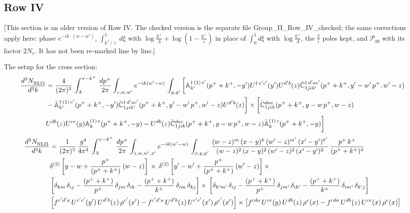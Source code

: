 \documentclass[9pt]{article}
\def\mf#1{\mathbb{#1}}
\numberwithin{equation}{section}
\begin{document}
\subsection{Row IV\,}
{\color{red}[This section is an older version of Row IV. The checked version is the separate file Group\_II\_Row\_IV\_checked; the same corrections apply here: phase $e^{-ik\cdot(w-w')}$, $\int_{k^+/\vee}^{1}d\xi$ with $\log\frac{k^+}{\Lambda}+\log(1-\frac{k^+}{\vee})$ in place of $\int_0^1 d\xi$ with $\log\frac{k^+}{\Lambda}$, the $\frac{2}{\epsilon}$ poles kept, and $\mathcal{P}_{gg}$ with its factor $2N_c$. It has not been re-marked line by line.]}\par\noindent The setup for the cross section: 
\begin{align}
    \frac{d^{3}N_{\rm NLO}^{\rm}}{d^{3}k}  & = \frac{4}{(2\pi)^{3}}\,\int_{\Lambda}^{\vee-k^{+}}\, \frac{dp^{+}}{2\pi}\int_{z,w,w^{\prime}} e^{-ik(w^{\prime}-w)}\,  \int_{y,y^{\prime}}\bigg[\mf{A}^{\dagger\, (1)\,e^{\prime}}_{k^{\prime}}(p^{+}+k^{+},-y^{\prime})U^{\dagger\, e^{\prime}c^{\prime}}(y^{\prime})U^{d^{\prime}b}(z) \Bar{\mf{C}}^{\dagger\, d^{\prime}ac^{\prime}}_{1jik^{\prime}}(p^{+}+k^{+},y^{\prime}-w^{\prime}\, p^{+},w^{\prime}-z) \notag \\ &  -\Bar{\mf{A}}^{\dagger\, (1)\,c^{\prime}}_{k^{\prime}}(p^{+}+k^{+},-y^{\prime}) \Bar{\mf{C}}^{\dagger\, d^{\prime}ac^{\prime}}_{1jik^{\prime}}(p^{+}+k^{+},y^{\prime}-w^{\prime}\, p^{+},w^{\prime}-z)U^{d^{\prime}b}(z)\bigg]\times\bigg[\Bar{\mf{C}}^{dac}_{1jik}(p^{+}+k^{+},y-w\, p^{+},w-z)\notag \\ & U^{db}(z)U^{ce}(y) \mf{A}^{(1)\,e}_{k}(p^{+}+k^{+},-y) -U^{db}(z) \Bar{\mf{C}}^{dac}_{1jik}(p^{+}+k^{+},y-w\, p^{+},w-z)\Bar{\mf{A}}^{(1)\,c}_{k}(p^{+}+k^{+},-y)\bigg]\nonumber
\end{align}
\begin{align}
     \frac{d^{3}N_{\rm NLO}^{\rm}}{d^{3}k}  & = \frac{1}{(2\pi)^{3}}\,\frac{g^{4}}{4\pi^{4}}\,\int_{\Lambda}^{\vee-k^{+}}\, \frac{dp^{+}}{2\pi}\int_{z,w,w^{\prime},x'} e^{-ik(w^{\prime}-w)}\,  \int_{x,y,y^{\prime}}\,\frac{(w-z)^{m}\,(x-y)^{k}\,(w'-z)^{m'}\,(x'-y')^{k'}}{(w-z)^{2}\,(x-y)^{2}\,(w'-z)^{2}\,(x'-y')^{2}}\,\frac{p^{+}\,k^{+}}{(p^{+}+k^{+})^{4}}\notag \\ & \delta^{(2)}\left[y-w+\frac{p^{+}}{(p^{+}+k^{+})}\,(w-z)\right]\,\times\, \delta^{(2)}\left[y'-w'+\frac{p^{+}}{(p^{+}+k^{+})}\,(w'-z)\right]\times\notag \\ &  \left[\delta_{km}\,\delta_{ij}-\frac{(p^{+}+k^{+})}{p^{+}}\,\delta_{jm}\,\delta_{ik}-\frac{(p^{+}+k^{+})}{k^{+}}\,\delta_{im}\,\delta_{kj}\right]\times\, \left[\delta_{k'm'}\,\delta_{ij}-\frac{(p^{+}+k^{+})}{p^{+}}\,\delta_{jm'}\,\delta_{ik'}-\frac{(p^{+}+k^{+})}{k^{+}}\,\delta_{im'}\,\delta_{k'j}\right]\notag \\ & \left[f^{c'd'a}\,U^{c'e'}(y')\,U^{d'b}(z)\,\rho^{e'}(x')-f^{c'd'a}\, 
    U^{d'b}(z)\,U^{c'e'}(x')\,\rho^{e'}(x')\right]\times \left[f^{cda}\,U^{ce}(y)\,U^{db}(z)\,\rho^{e}(x)-f^{cda}\, 
    U^{db}(z)\,U^{ce}(x)\,\rho^{e}(x)\right]
\end{align}
\end{document}
